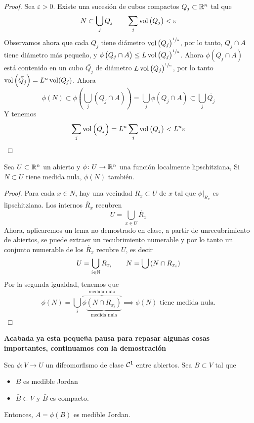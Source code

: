 \begin{proof}
    Sea $\varepsilon > 0$. Existe una sucesión de cubos compactos $Q_j \subset \mathbb{R}^n$ tal que
    \[
        N \subset \bigcup_j Q_j \qquad \sum_j \operatorname{vol}\left( Q_j \right) < \varepsilon
    \]
    Observamos ahora que cada $Q_j$ tiene diámetro $\operatorname{vol}\left( Q_j \right)^{\sfrac{1}{n}}$, por lo tanto,
    $Q_j \cap A$ tiene diámetro más pequeño, y $\phi\left( Q_j \cap A \right) \leq L \operatorname{vol}\left( Q_j \right)^{\sfrac{1}{n}}$. Ahora
    $\phi\left( Q_j \cap A \right)$ está contenido en un cubo $\bar{Q_j}$ de diámetro $L \operatorname{vol}\left( Q_j \right)^{\sfrac{1}{n}}$, por lo tanto
    $\operatorname{vol}\left( \bar{Q_j} \right) = L^n \operatorname{vol}(Q_j)$. Ahora
    \[
        \phi(N) \subset \phi\left( \bigcup_{j} \left( Q_j \cap A \right) \right) = \bigcup_j \phi\left( Q_j \cap A \right) \subset \bigcup_j \bar{Q_j}
    \]
    Y tenemos
    \[
        \sum_j \operatorname{vol}\left( \bar{Q_j} \right) = L^n \sum_j \operatorname{vol}\left( Q_j \right) < L^n \varepsilon
    \]
\end{proof}

\begin{lema*}
    Sea $U \subset \mathbb{R}^n$ un abierto y $\phi \colon U \to \mathbb{R}^n$ una función localmente lipschitziana, Si $N \subset U$ tiene
    medida nula, $\phi(N)$ tambi\'en.
\end{lema*}

\begin{proof}
    Para  cada $x \in N$, hay una vecindad $R_x \subset U$ de $x$ tal que $\phi\vert_{R_x}$ es lipschitziana. Los internos $\mathring{R_x}$ recubren
    \[
        U = \bigcup_{x \in U} \mathring{R_x}
    \]
    Ahora, aplicaremos un lema no demostrado en clase, a partir de unrecubrimiento de abiertos, se puede extraer un recubrimiento numerable y por lo tanto
    un conjunto numerable de los $\mathring{R_x}$ recubre $U$, es decir
    \[
        U =\bigcup_{i \in \mathbb{N}} R_{x_i} \qquad N = \bigcup\left( N \cap R_{x_i} \right)
    \]
    Por la segunda igualdad, tenemos que
    \[
        \phi(N) =\bigcup_{i} \overbrace{\phi \underbrace{\left(N \cap R_{x_i}\right)}_{\text{medida nula}} }^{\text{medida nula}} \implies
        \phi(N) \text{ tiene medida nula.}
    \]
\end{proof}

\textbf{Acabada ya esta pequeña pausa para repasar algunas cosas importantes, continuamos con la demostración}

\begin{lema*}[0]\label{lema:cero_cambio}
    Sea $\phi \colon V \to U$ un difeomorfismo de clase $\mathcal{C}^1$ entre abiertos. Sea $B \subset V$ tal que
    \begin{itemize}
        \item $B$ es medible Jordan
        \item $\bar{B} \subset V$ y $\bar{B}$ es compacto.
    \end{itemize}
    Entonces, $A = \phi(B)$ es medible Jordan.
\end{lema*}

